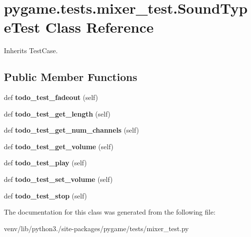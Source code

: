\hypertarget{classpygame_1_1tests_1_1mixer__test_1_1_sound_type_test}{}\section{pygame.\+tests.\+mixer\+\_\+test.\+Sound\+Type\+Test Class Reference}
\label{classpygame_1_1tests_1_1mixer__test_1_1_sound_type_test}


Inherits Test\+Case.

\subsection*{Public Member Functions}
\begin{DoxyCompactItemize}
\item 
\mbox{\label{classpygame_1_1tests_1_1mixer__test_1_1_sound_type_test_a5192a785632ac4a52fb74d09983059f2}} 
def {\bfseries todo\+\_\+test\+\_\+fadeout} (self)
\item 
\mbox{\label{classpygame_1_1tests_1_1mixer__test_1_1_sound_type_test_a573f3cf3bc24d8c58b00cd1815640e23}} 
def {\bfseries todo\+\_\+test\+\_\+get\+\_\+length} (self)
\item 
\mbox{\label{classpygame_1_1tests_1_1mixer__test_1_1_sound_type_test_ab3147de6a9d696b4ec19b01a54ec14d1}} 
def {\bfseries todo\+\_\+test\+\_\+get\+\_\+num\+\_\+channels} (self)
\item 
\mbox{\label{classpygame_1_1tests_1_1mixer__test_1_1_sound_type_test_aabda217132ccb33d5840665f98cedc05}} 
def {\bfseries todo\+\_\+test\+\_\+get\+\_\+volume} (self)
\item 
\mbox{\label{classpygame_1_1tests_1_1mixer__test_1_1_sound_type_test_adabe3cf53689cbf90c68b9385be28379}} 
def {\bfseries todo\+\_\+test\+\_\+play} (self)
\item 
\mbox{\label{classpygame_1_1tests_1_1mixer__test_1_1_sound_type_test_af798446af1e845f6103a67206c64ef75}} 
def {\bfseries todo\+\_\+test\+\_\+set\+\_\+volume} (self)
\item 
\mbox{\label{classpygame_1_1tests_1_1mixer__test_1_1_sound_type_test_a2fe8d0d0f8a958c05ca16d1e6eee1736}} 
def {\bfseries todo\+\_\+test\+\_\+stop} (self)
\end{DoxyCompactItemize}


The documentation for this class was generated from the following file\+:\begin{DoxyCompactItemize}
\item 
venv/lib/python3./site-\/packages/pygame/tests/mixer\+\_\+test.\+py\end{DoxyCompactItemize}
